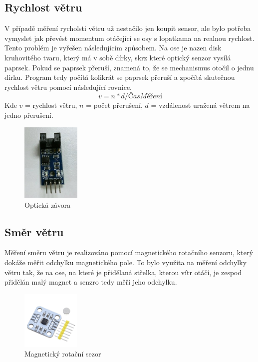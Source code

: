 \subsection{Rychlost větru}
V případě měření rycholsti větru už nestačilo jen koupit sensor, ale bylo potřeba vymyslet jak převést momentum otáčející se osy s lopatkama na realnou rychlost.
Tento problém je vyřešen následujícím způsobem. Na ose je nazen disk kruhovitého tvaru, který má v sobě dírky, skrz které optický senzor vysílá paprsek. Pokud se paprsek přeruší,
znamená to, že se mechanismus otočil o jednu dírku. Program tedy počítá kolikrát se paprsek přeruší a zpočítá skutečnou rychlost větru pomocí následující rovnice.
\begin{equation}
v = n * d / ČasMěření 
\end{equation}
Kde $v$ = rychlost větru, $n$ = počet přerušení, $d$ = vzdálenost uražená větrem na jedno přerušení.

\begin{figure}[h] 
    \centering
    \includegraphics[width=0.25\textwidth]{images/ir_sensor.png}
    \caption{Optická závora}
\end{figure}

\subsection{Směr větru}
Měření směru větru je realizováno pomocí magnetického rotačního senzoru, který dokáže měřit odchylku magnetického pole. To bylo využita na měření odchylky větru tak, že na ose, na které je přidělaná střelka, kterou vítr otáčí, je zespod přidělán
malý magnet a senzro tedy měří jeho odchylku.

\begin{figure}[h] 
    \centering
    \includegraphics[width=0.25\textwidth]{images/AS5600.jpg}
    \caption{Magnetický rotační sezor}
\end{figure}

